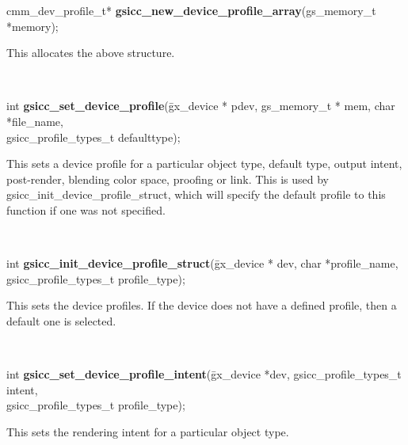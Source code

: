 \documentclass[12pt,notitlepage]{article}
\begin{document}
\begin{tabbing}
\noindent cmm\_dev\_profile\_t* {\bf gsicc\_new\_device\_profile\_array}(gs\_memory\_t *memory);\\
\end{tabbing}

\begin{minipage}[h]{6.0in}
This allocates the above structure.
\end{minipage}\\

\begin{tabbing}
\noindent int {\bf gsicc\_set\_device\_profile}(\=gx\_device * pdev, gs\_memory\_t * mem,
                             char *file\_name,\\
                             \>gsicc\_profile\_types\_t defaulttype);\\
\end{tabbing}


\begin{minipage}[h]{6.0in}
This sets a device profile for a particular object type, default type, output intent, post-render, blending color space, proofing or link.  This is used by gsicc\_init\_device\_profile\_struct, which
will specify the default profile to this function if one was not specified.
\end{minipage}\\

\begin{tabbing}
\noindent int {\bf gsicc\_init\_device\_profile\_struct}(\=gx\_device * dev,  char *profile\_name,\\
\>gsicc\_profile\_types\_t profile\_type);\\
\end{tabbing}

\begin{minipage}[h]{6.0in}
This sets the device profiles. If the device does not have a defined profile, then a default one is selected.
\end{minipage}\\

\begin{tabbing}
\noindent int {\bf gsicc\_set\_device\_profile\_intent}(\=gx\_device *dev, gsicc\_profile\_types\_t intent,\\
\>gsicc\_profile\_types\_t profile\_type);\\
\end{tabbing}

\begin{minipage}[h]{6.0in}
This sets the rendering intent for a particular object type.
\end{minipage}\\
\end{document}
